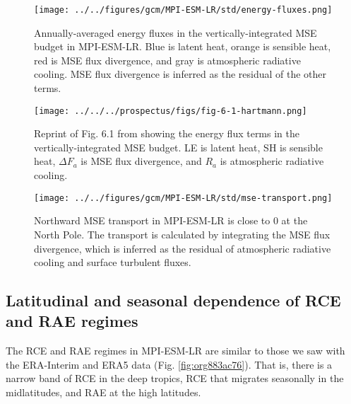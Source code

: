 \documentclass[11pt]{article}
\begin{document}
\begin{figure}[htbp]
\centering
\texttt{[image: ../../figures/gcm/MPI-ESM-LR/std/energy-fluxes.png]}
\caption{\label{fig:org5f2a2e6}Annually-averaged energy fluxes in the vertically-integrated MSE budget in MPI-ESM-LR. Blue is latent heat, orange is sensible heat, red is MSE flux divergence, and gray is atmospheric radiative cooling. MSE flux divergence is inferred as the residual of the other terms.}
\end{figure}

\begin{figure}[htbp]
\centering
\texttt{[image: ../../../prospectus/figs/fig-6-1-hartmann.png]}
\caption{\label{fig:org60d8d59}Reprint of Fig. 6.1 from \cite{hartmann_global_2016} showing the energy flux terms in the vertically-integrated MSE budget. LE is latent heat, SH is sensible heat, \(\Delta F_a\) is MSE flux divergence, and \(R_a\) is atmospheric radiative cooling.}
\end{figure}

\begin{figure}[htbp]
\centering
\texttt{[image: ../../figures/gcm/MPI-ESM-LR/std/mse-transport.png]}
\caption{\label{fig:org61089fa}Northward MSE transport in MPI-ESM-LR is close to 0 at the North Pole. The transport is calculated by integrating the MSE flux divergence, which is inferred as the residual of atmospheric radiative cooling and surface turbulent fluxes.}
\end{figure}

\subsection{Latitudinal and seasonal dependence of RCE and RAE regimes}
\label{sec:orgd8a4e8b}
The RCE and RAE regimes in MPI-ESM-LR are similar to those we saw with the ERA-Interim and ERA5 data (Fig. \ref{fig:org883ac76}). That is, there is a narrow band of RCE in the deep tropics, RCE that migrates seasonally in the midlatitudes, and RAE at the high latitudes.
\end{document}
